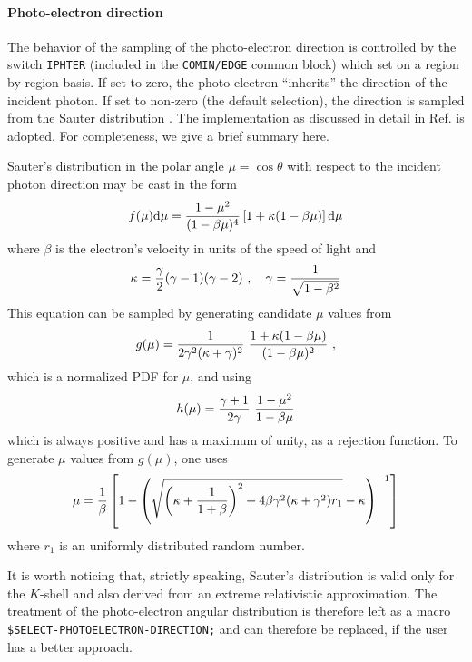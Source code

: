 \paragraph{Photo-electron direction}\hfill
\label{photo_direction}

The behavior of the sampling of the photo-electron direction
is controlled by the switch {\tt IPHTER}
(included in the {\tt COMIN/EDGE} common block) which set on a
region by region basis. If set to zero,
the photo-electron ``inherits'' the direction of the incident
photon. If set to non-zero (the default selection),
the direction is sampled from the
Sauter distribution \cite{Sa31}. The implementation as discussed
in detail in Ref. \cite{BR86a} is adopted. For completeness, we give a
brief summary here.

Sauter's distribution in the polar angle
$\mu = \cos \theta$ with respect to the incident
photon direction may be cast in the form \cite{BR86a}
\begin{equation}
f(\mu) {\rm d}\mu = {1 - \mu^2 \over (1 - \beta \mu)^4} \left[ 1 +
\kappa (1 - \beta \mu) \right] {\rm d} \mu
\end{equation}
where $\beta$ is the electron's velocity in units of the
speed of light  and
\begin{equation}
\kappa = {\gamma \over 2} (\gamma - 1) (\gamma - 2)~, \quad \gamma =
{1 \over \sqrt{1 - \beta^2} }
\end{equation}
This equation can be sampled by generating candidate
$\mu$ values from
\begin{equation}
g(\mu) = {1 \over 2 \gamma^2 (\kappa + \gamma)^2} ~{
1 + \kappa (1 - \beta \mu) \over (1 - \beta \mu)^2 }~,
\end{equation}
which is a normalized PDF for $\mu$, and using
\begin{equation}
h(\mu) = { \gamma + 1 \over 2 \gamma } ~{1 - \mu^2 \over 1 - \beta \mu }
\end{equation}
which is always positive and has a maximum of unity,
as a rejection function. To generate $\mu$ values from
$g(\mu)$, one uses
\begin{equation}
\mu = {1 \over \beta} \left[1 - \left( \sqrt{\left(\kappa + {1 \over 1 + \beta}
\right)^2 + 4 \beta \gamma^2 (\kappa + \gamma^2) r_1} - \kappa \right)^{-1}
\right]
\end{equation}
where $r_1$ is an uniformly distributed random number.

It is worth noticing that, strictly speaking, Sauter's distribution is
valid only for the $K$-shell and also derived
from an extreme relativistic approximation. The treatment
of the photo-electron angular distribution is therefore left
as a macro {\tt \$SELECT-PHOTOELECTRON-DIRECTION;}
and can therefore be replaced, if the user has a better approach.

